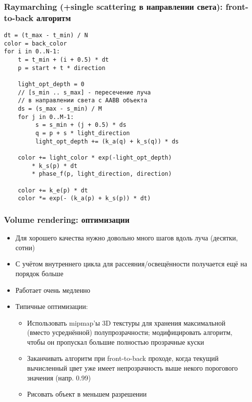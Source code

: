 \documentclass{beamer}
\begin{document}
\begin{frame}[fragile]
\frametitle{Raymarching (+single scattering в направлении света): front-to-back алгоритм}
\fontsize{8pt}{8pt}
\begin{verbatim}
dt = (t_max - t_min) / N
color = back_color
for i in 0..N-1:
    t = t_min + (i + 0.5) * dt
    p = start + t * direction

    light_opt_depth = 0
    // [s_min .. s_max] - пересечение луча
    // в направлении света с AABB объекта
    ds = (s_max - s_min) / M
    for j in 0..M-1:
         s = s_min + (j + 0.5) * ds
         q = p + s * light_direction
         light_opt_depth += (k_a(q) + k_s(q)) * ds
         
    color += light_color * exp(-light_opt_depth)
        * k_s(p) * dt
        * phase_f(p, light_direction, direction)

    color += k_e(p) * dt
    color *= exp(- (k_a(p) + k_s(p)) * dt)
\end{verbatim}
\end{frame}

\begin{frame}[fragile]
\frametitle{Volume rendering: оптимизации}
\begin{itemize}
\item Для хорошего качества нужно довольно много шагов вдоль луча (десятки, сотни)
\pause
\item С учётом внутреннего цикла для рассеяния/освещённости получается ещё на порядок больше
\pause
\item Работает очень медленно
\pause
\item Типичные оптимизации:
\begin{itemize}
\item Использовать mipmap'ы 3D текстуры для хранения максимальной (вместо усреднённой) полупрозрачности; модифицировать алгоритм, чтобы он пропускал большие полностью прозрачные куски
\pause
\item Заканчивать алгоритм при front-to-back проходе, когда текущий вычисленный цвет уже имеет непрозрачность выше некого порогового значения (напр. 0.99)
\pause
\item Рисовать объект в меньшем разрешении
\end{itemize}
\end{itemize}
\end{frame}
\end{document}
